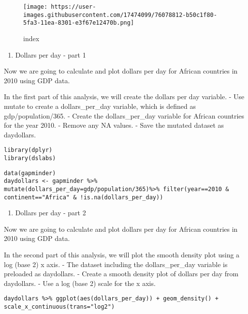 \documentclass[]{article}
\providecommand{\tightlist}{%
  \setlength{\itemsep}{0pt}\setlength{\parskip}{0pt}}
\begin{document}
\begin{figure}
\centering
\texttt{[image: https://user-images.githubusercontent.com/17474099/76078812-b50c1f80-5fa3-11ea-8301-e3f67e12470b.png]}
\caption{index}
\end{figure}

\begin{enumerate}
\def\labelenumi{\arabic{enumi}.}
\setcounter{enumi}{6}
\tightlist
\item
  Dollars per day - part 1
\end{enumerate}

Now we are going to calculate and plot dollars per day for African
countries in 2010 using GDP data.

In the first part of this analysis, we will create the dollars per day
variable. - Use mutate to create a dollars\_per\_day variable, which is
defined as gdp/population/365. - Create the dollars\_per\_day variable
for African countries for the year 2010. - Remove any NA values. - Save
the mutated dataset as daydollars.

\begin{verbatim}
library(dplyr)
library(dslabs)
\end{verbatim}

\begin{verbatim}
data(gapminder)
daydollars <- gapminder %>% mutate(dollars_per_day=gdp/population/365)%>% filter(year==2010 & continent=="Africa" & !is.na(dollars_per_day))
\end{verbatim}

\begin{enumerate}
\def\labelenumi{\arabic{enumi}.}
\setcounter{enumi}{7}
\tightlist
\item
  Dollars per day - part 2
\end{enumerate}

Now we are going to calculate and plot dollars per day for African
countries in 2010 using GDP data.

In the second part of this analysis, we will plot the smooth density
plot using a log (base 2) x axis. - The dataset including the
dollars\_per\_day variable is preloaded as daydollars. - Create a smooth
density plot of dollars per day from daydollars. - Use a log (base 2)
scale for the x axis.

\begin{verbatim}
daydollars %>% ggplot(aes(dollars_per_day)) + geom_density() + scale_x_continuous(trans="log2")
\end{verbatim}
\end{document}
